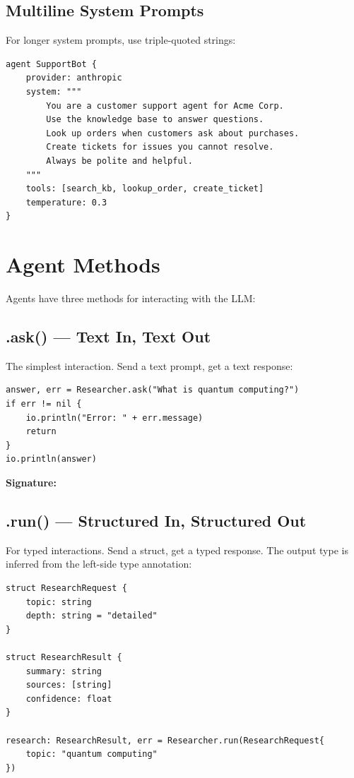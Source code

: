 \subsection{Multiline System Prompts}

For longer system prompts, use triple-quoted strings:

\begin{lstlisting}
agent SupportBot {
    provider: anthropic
    system: """
        You are a customer support agent for Acme Corp.
        Use the knowledge base to answer questions.
        Look up orders when customers ask about purchases.
        Create tickets for issues you cannot resolve.
        Always be polite and helpful.
    """
    tools: [search_kb, lookup_order, create_ticket]
    temperature: 0.3
}
\end{lstlisting}

\section{Agent Methods}

Agents have three methods for interacting with the LLM:

\subsection{.ask() --- Text In, Text Out}

The simplest interaction. Send a text prompt, get a text response:

\begin{lstlisting}
answer, err = Researcher.ask("What is quantum computing?")
if err != nil {
    io.println("Error: " + err.message)
    return
}
io.println(answer)
\end{lstlisting}

\textbf{Signature:} 

\subsection{.run() --- Structured In, Structured Out}

For typed interactions. Send a struct, get a typed response. The output type is inferred from the left-side type annotation:

\begin{lstlisting}
struct ResearchRequest {
    topic: string
    depth: string = "detailed"
}

struct ResearchResult {
    summary: string
    sources: [string]
    confidence: float
}

research: ResearchResult, err = Researcher.run(ResearchRequest{
    topic: "quantum computing"
})
\end{lstlisting}

